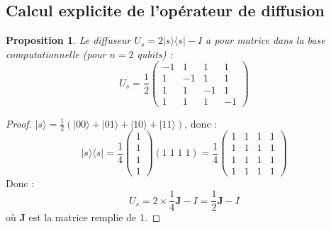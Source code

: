 \documentclass[12pt,a4paper]{article}
\newtheorem{proposition}[theorem]{Proposition}
\theoremstyle{definition}
\theoremstyle{remark}
\begin{document}
\subsection{Calcul explicite de l'opérateur de diffusion}

\begin{proposition}
Le diffuseur $U_s = 2|s\rangle\langle s| - I$ a pour matrice dans la base computationnelle (pour $n = 2$ qubits) :
\[
U_s = \frac{1}{2} \begin{pmatrix}
-1 & 1 & 1 & 1 \\
1 & -1 & 1 & 1 \\
1 & 1 & -1 & 1 \\
1 & 1 & 1 & -1
\end{pmatrix}
\]
\end{proposition}

\begin{proof}
$|s\rangle = \frac{1}{2}(|00\rangle + |01\rangle + |10\rangle + |11\rangle)$, donc :
\[
|s\rangle\langle s| = \frac{1}{4} \begin{pmatrix} 1 \\ 1 \\ 1 \\ 1 \end{pmatrix} (1 \; 1 \; 1 \; 1) = \frac{1}{4} \begin{pmatrix}
1 & 1 & 1 & 1 \\
1 & 1 & 1 & 1 \\
1 & 1 & 1 & 1 \\
1 & 1 & 1 & 1
\end{pmatrix}
\]
Donc :
\[
U_s = 2 \times \frac{1}{4} \mathbf{J} - I = \frac{1}{2}\mathbf{J} - I
\]
où $\mathbf{J}$ est la matrice remplie de 1.
\end{proof}

\newpage
\end{document}
